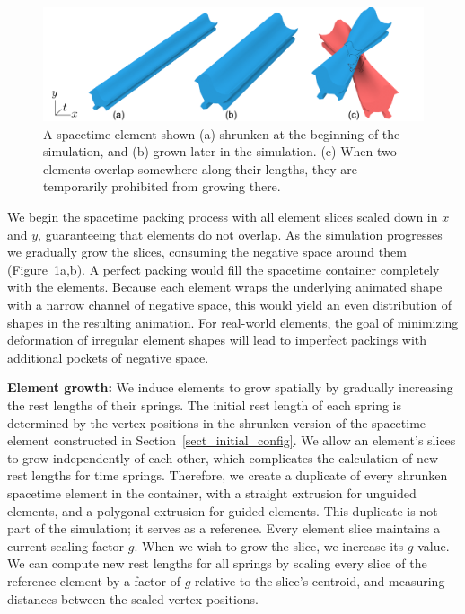 \begin{figure}
\centering
\includegraphics[width=1.0\textwidth]{figures/animationpak/growth.pdf} 
\caption[Element growths]
{\label{fig_animationpak_growth} 
A spacetime element shown (a) shrunken at the beginning of the simulation,
and (b) grown later in the simulation. (c) When two elements overlap
somewhere along their lengths, they are temporarily prohibited from growing
there.
}
\end{figure}

We begin the spacetime packing process with all element slices scaled
down in $x$ and $y$, guaranteeing that elements do not 
overlap.  As the simulation progresses we gradually grow the slices, 
consuming the negative space around them (Figure~\ref{fig_animationpak_growth}a,b).
A perfect packing would fill the spacetime container completely with the elements.
Because each element wraps the underlying animated shape with a narrow channel
of negative space, this would yield an even
distribution of shapes in the resulting animation.
For real-world elements, the goal of minimizing deformation of irregular 
element shapes will lead to imperfect packings with additional pockets
of negative space.


\textbf{Element growth:}
We induce elements to grow spatially by gradually increasing the rest 
lengths of their springs.
The initial rest length of each spring is determined by the vertex positions in
the shrunken version of the spacetime element constructed in 
Section~\ref{sect_initial_config}.
We allow an element's slices to grow independently of each other, which
complicates the calculation of new rest lengths for time springs.
Therefore, we create a duplicate of every shrunken spacetime element
in the container, with a straight extrusion
for unguided elements, and a polygonal extrusion for guided elements.
This duplicate is not part of the simulation; it serves as a reference.
Every element slice maintains a current scaling factor $g$.
When we wish to grow the slice, we increase its $g$ value.
We can compute new rest lengths for all springs by scaling every slice
of the reference element by a factor of $g$ relative to the
slice's centroid, and measuring distances between the scaled vertex
positions.  

